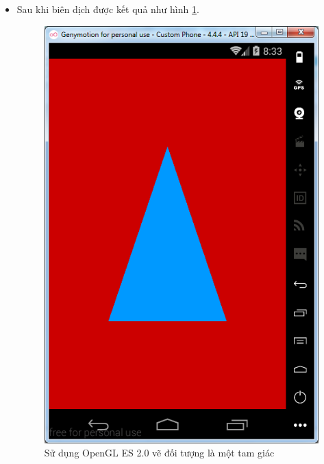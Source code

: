 \documentclass[13pt,a4paper]{extreport}
\begin{document}
\begin{itemize}
		\newpage
		\item Sau khi biên dịch được kết quả như hình \ref{Fig:opengles-2}.
				\begin{figure}[!h]
					\begin{center}
						\includegraphics[scale=.6]{opengles-2.png}
					\end{center}
					\caption{Sử dụng OpenGL ES 2.0 vẽ đối tượng là một tam giác} \label{Fig:opengles-2}
				\end{figure}						
	\end{itemize}
\end{document}
